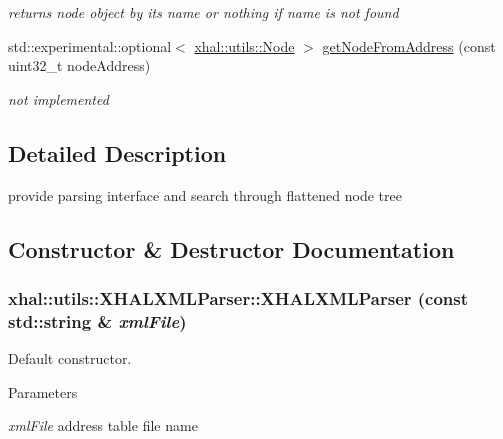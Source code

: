 \begin{DoxyCompactItemize}
\begin{DoxyCompactList}\small\item\em returns node object by its name or nothing if name is not found \item\end{DoxyCompactList}\item 
\hypertarget{classxhal_1_1utils_1_1XHALXMLParser_a439a98bf49b7c6251ace706850bb0232}{
std::experimental::optional$<$ \hyperlink{classxhal_1_1utils_1_1Node}{xhal::utils::Node} $>$ \hyperlink{classxhal_1_1utils_1_1XHALXMLParser_a439a98bf49b7c6251ace706850bb0232}{getNodeFromAddress} (const uint32\_\-t nodeAddress)}
\label{classxhal_1_1utils_1_1XHALXMLParser_a439a98bf49b7c6251ace706850bb0232}

\begin{DoxyCompactList}\small\item\em not implemented \item\end{DoxyCompactList}\end{DoxyCompactItemize}


\subsection{Detailed Description}
provide parsing interface and search through flattened node tree 

\subsection{Constructor \& Destructor Documentation}
\hypertarget{classxhal_1_1utils_1_1XHALXMLParser_a66d4932f44632ddc323db95fb6e0d7f0}{
\subsubsection[{XHALXMLParser}]{\setlength{\rightskip}{0pt plus 5cm}xhal::utils::XHALXMLParser::XHALXMLParser (const std::string \& {\em xmlFile})}}
\label{classxhal_1_1utils_1_1XHALXMLParser_a66d4932f44632ddc323db95fb6e0d7f0}


Default constructor. 
\begin{DoxyParams}{Parameters}
\item[{\em xmlFile}]address table file name \end{DoxyParams}


